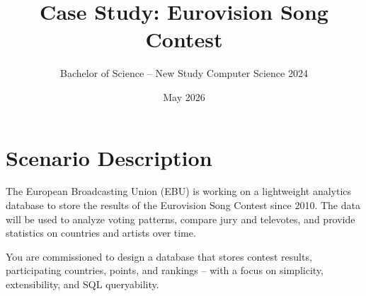 \documentclass[a4paper,12pt]{article}
\title{Case Study: Eurovision Song Contest}
\author{Bachelor of Science – New Study Computer Science 2024}
\date{May 2026}
\begin{document}
\maketitle

\section{Scenario Description}

The European Broadcasting Union (EBU) is working on a lightweight analytics database to store the results of the Eurovision Song Contest since 2010. The data will be used to analyze voting patterns, compare jury and televotes, and provide statistics on countries and artists over time.

You are commissioned to design a database that stores contest results, participating countries, points, and rankings – with a focus on simplicity, extensibility, and SQL queryability.

\newpage


\newpage


\newpage


\newpage

\end{document}
